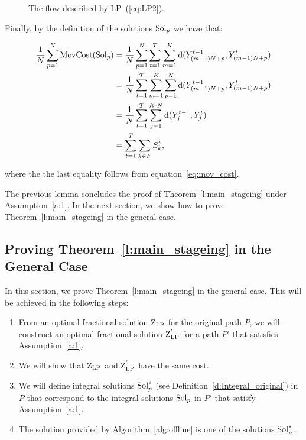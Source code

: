 \begin{proof2}
\begin{figure}[ht]
\caption{The flow described by LP~(\ref{eq:LP2}).} \label{f:flow}
\end{figure}


\noindent
Finally, by the definition of the solutions $\mathrm{Sol}_p$ we have that:

\begin{align*}
\frac{1}{N}\sum\limits_{p=1}^N \mathrm{MovCost}(\mathrm{Sol}_p) &= 
\frac{1}{N}
\sum\limits_{p=1}^N \sum\limits_{t=1}^T \sum_{m= 1}^K \mathrm{d}(Y^{t-1}_{(m-1)N + 
p},Y^t_{(m-1)N + p})\\
&=
\frac{1}{N}
\sum\limits_{t=1}^T \sum_{m=1}^K\sum\limits_{p=1}^N 
\mathrm{d}(Y^{t-1}_{(m-1)N+p},Y^t_{(m-1)N+p})\\
&= 
\frac{1}{N}
\sum\limits_{t=1}^T \sum_{j=1}^{K \cdot N} \mathrm{d}(Y^{t-1}_j,Y^t_j)\\
&=
\sum_{t=1}^T\sum_{k\in F} S_k^t,
\end{align*}

where the the last equality follows from equation~\ref{eq:mov_cost}.
\end{proof2}
\medskip

The previous lemma concludes the proof of Theorem~\ref{l:main_stageing} under Assumption~\ref{a:1}. In the next section, we show how to prove Theorem~\ref{l:main_stageing} in the general case.







\subsection{Proving Theorem~\ref{l:main_stageing} in the General Case} \label{s:rounding_general}
In this section, we prove Theorem~\ref{l:main_stageing}
in the general case.
This will be achieved in the following steps:
\begin{enumerate}
    \item From an optimal fractional  solution $\mathrm{Z}_{\mathrm{LP}}$ for the original path $P$, we will construct an optimal fractional solution $\mathrm{Z}_{\mathrm{LP}}^{'}$ for a path $P'$ that satisfies Assumption~\ref{a:1}.
    \item We will show that $\mathrm{Z}_{\mathrm{LP}}$ and $\mathrm{Z}_{\mathrm{LP}}^{'}$ have the same cost.  
    \item We will define integral solutions $\mathrm{Sol}_p^*$ (see Definition~\ref{d:Integral_original}) in $P$ that correspond to the integral solutions $\mathrm{Sol}_p$ in $P'$ that satisfy Assumption~\ref{a:1}.
    \item The solution provided by Algorithm~\ref{alg:offline} is one of the solutions $\mathrm{Sol}_p^*$.
\end{enumerate}


